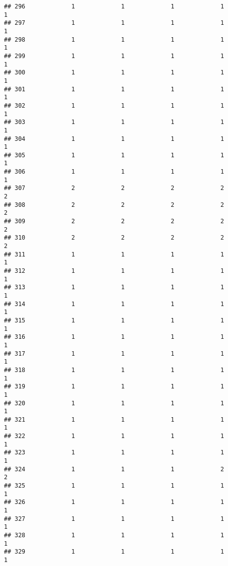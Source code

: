 \documentclass[
]{article}
\begin{document}
\begin{verbatim}
## 296             1             1             1             1             1
## 297             1             1             1             1             1
## 298             1             1             1             1             1
## 299             1             1             1             1             1
## 300             1             1             1             1             1
## 301             1             1             1             1             1
## 302             1             1             1             1             1
## 303             1             1             1             1             1
## 304             1             1             1             1             1
## 305             1             1             1             1             1
## 306             1             1             1             1             1
## 307             2             2             2             2             2
## 308             2             2             2             2             2
## 309             2             2             2             2             2
## 310             2             2             2             2             2
## 311             1             1             1             1             1
## 312             1             1             1             1             1
## 313             1             1             1             1             1
## 314             1             1             1             1             1
## 315             1             1             1             1             1
## 316             1             1             1             1             1
## 317             1             1             1             1             1
## 318             1             1             1             1             1
## 319             1             1             1             1             1
## 320             1             1             1             1             1
## 321             1             1             1             1             1
## 322             1             1             1             1             1
## 323             1             1             1             1             1
## 324             1             1             1             2             2
## 325             1             1             1             1             1
## 326             1             1             1             1             1
## 327             1             1             1             1             1
## 328             1             1             1             1             1
## 329             1             1             1             1             1

\end{verbatim}
\end{document}

